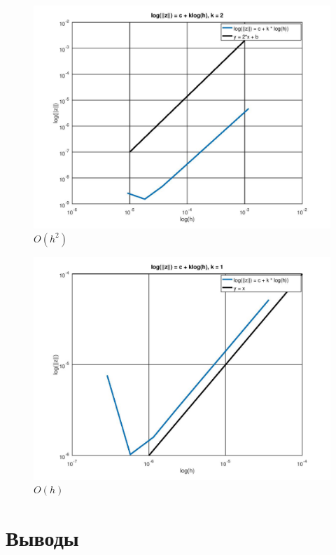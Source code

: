 \documentclass[12pt]{article}
\begin{document}
\begin{figure}
\begin{center}
\includegraphics[scale = 0.4]{loglog2.jpg} 
\end{center}
\caption{$O(h^2)$}
\end{figure}

\begin{figure}
\begin{center}
\includegraphics[scale = 0.4]{loglog1.jpg} 
\end{center}
\caption{$O(h)$}
\end{figure}

\section{Выводы}
\end{document}
